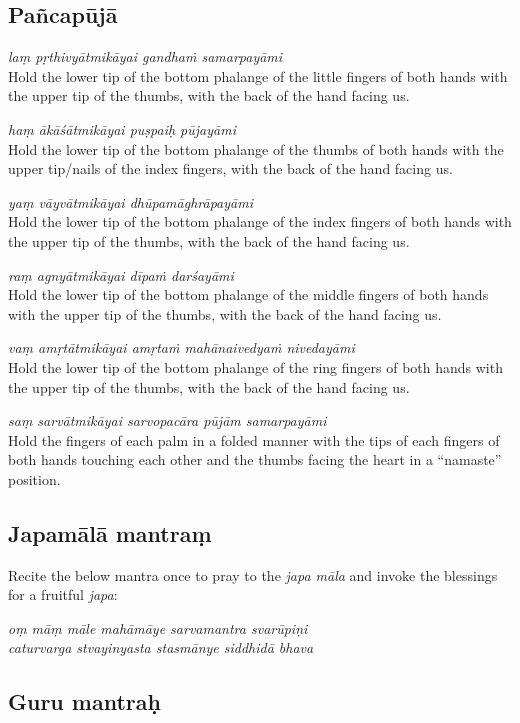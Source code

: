 \documentclass[11pt,oneside,a4paper]{article}
\newenvironment{shloka}[1]
  {\bigskip\center#1\varwidth{\linewidth}}
  {\endvarwidth\endcenter\bigskip}
\newcommand{\tl}[1]{\emph{#1}}
\begin{document}
\subsection{Pañcapūjā}

\tl{laṃ pṛthivyātmikāyai gandhaṁ samarpayāmi}\\
Hold the lower tip of the bottom phalange of the little fingers of both hands
with the upper tip of the thumbs, with the back of the hand facing us.

\tl{haṃ ākāśātmikāyai puṣpaiḥ pūjayāmi}\\
Hold the lower tip of the bottom phalange of the thumbs of both hands with
the upper tip/nails of the index fingers, with the back of the hand facing us.

\tl{yaṃ vāyvātmikāyai dhūpamāghrāpayāmi}\\
Hold the lower tip of the bottom phalange of the index fingers of both hands
with the upper tip of the thumbs, with the back of the hand facing us.

\tl{raṃ agnyātmikāyai dīpaṁ darśayāmi}\\
Hold the lower tip of the bottom phalange of the middle fingers of both hands
with the upper tip of the thumbs, with the back of the hand facing us.

\tl{vaṃ amṛtātmikāyai amṛtaṁ mahānaivedyaṁ nivedayāmi}\\
Hold the lower tip of the bottom phalange of the ring fingers of both hands
with the upper tip of the thumbs, with the back of the hand facing us.

\tl{saṃ sarvātmikāyai sarvopacāra pūjām samarpayāmi}\\
Hold the fingers of each palm in a folded manner with the tips of each fingers
of both hands touching each other and the thumbs facing the heart in
a ``namaste'' position.

\subsection{Japamālā mantraṃ}

Recite the below mantra once to pray to the \tl{japa māla} and invoke
the blessings for a fruitful \tl{japa}:

\begin{shloka}\itshape
  oṃ māṃ māle mahāmāye sarvamantra svarūpiṇi\\
  caturvarga stvayinyasta stasmānye siddhidā bhava
\end{shloka}

\subsection{Guru mantraḥ}
\end{document}
